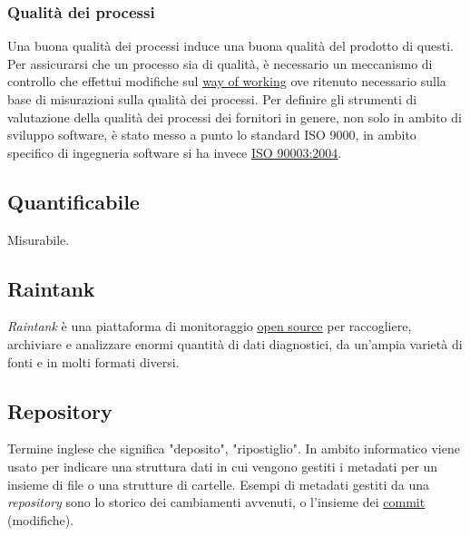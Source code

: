 	\subsubsection{Qualità dei processi}
	\label{sec:qualitaprocesso}
	Una buona qualità dei processi induce una buona qualità del prodotto di questi. Per assicurarsi che un processo sia di qualità, è necessario un meccanismo di controllo che effettui modifiche sul \underline{\hyperref[sec:wow]{way of working}} ove ritenuto necessario sulla base di misurazioni sulla qualità dei processi. Per definire gli strumenti di valutazione della qualità dei processi dei fornitori in genere, non solo in ambito di sviluppo software, è stato messo a punto lo standard ISO 9000, in ambito specifico di ingegneria software si ha invece \underline{\hyperref[sec:iso90003]{ISO 90003:2004}}.

	\subsection{Quantificabile}
	\label{sec:quantificabile}
	Misurabile.

	\newpage


	\subsection{Raintank}
	\label{sec:raintank}
	\emph{Raintank} è una piattaforma di monitoraggio \underline{\hyperref[sec:opensource]{open source}} per raccogliere, archiviare e analizzare enormi quantità di dati diagnostici, da un'ampia varietà di fonti e in molti formati diversi.


	\subsection{Repository}
	\label{sec:repo}
	Termine inglese che significa "deposito", "ripostiglio". In ambito informatico viene usato per indicare una struttura dati in cui vengono gestiti i metadati per un insieme di file o una strutture di cartelle. Esempi di metadati gestiti da una \emph{repository} sono lo storico dei cambiamenti avvenuti, o l'insieme dei \underline{\hyperref[sec:commit]{commit}} (modifiche).


